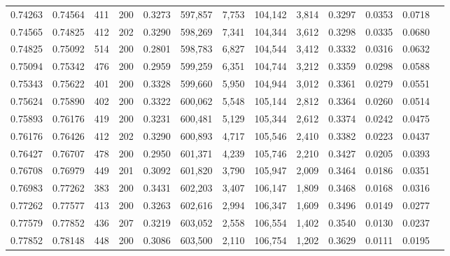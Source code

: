 \begin{tabular}{rrrrrrrrrrrrr}
0.74263 & 0.74564 &   411 & 200 &                                     0.3273 & 597,857 &   7,753 & 104,142 &   3,814 & 0.3297 & 0.0353 & 0.0718 \\
0.74565 & 0.74825 &   412 & 202 &                                     0.3290 & 598,269 &   7,341 & 104,344 &   3,612 & 0.3298 & 0.0335 & 0.0680 \\
0.74825 & 0.75092 &   514 & 200 &                                     0.2801 & 598,783 &   6,827 & 104,544 &   3,412 & 0.3332 & 0.0316 & 0.0632 \\
0.75094 & 0.75342 &   476 & 200 &                                     0.2959 & 599,259 &   6,351 & 104,744 &   3,212 & 0.3359 & 0.0298 & 0.0588 \\
0.75343 & 0.75622 &   401 & 200 &                                     0.3328 & 599,660 &   5,950 & 104,944 &   3,012 & 0.3361 & 0.0279 & 0.0551 \\
0.75624 & 0.75890 &   402 & 200 &                                     0.3322 & 600,062 &   5,548 & 105,144 &   2,812 & 0.3364 & 0.0260 & 0.0514 \\
0.75893 & 0.76176 &   419 & 200 &                                     0.3231 & 600,481 &   5,129 & 105,344 &   2,612 & 0.3374 & 0.0242 & 0.0475 \\
0.76176 & 0.76426 &   412 & 202 &                                     0.3290 & 600,893 &   4,717 & 105,546 &   2,410 & 0.3382 & 0.0223 & 0.0437 \\
0.76427 & 0.76707 &   478 & 200 &                                     0.2950 & 601,371 &   4,239 & 105,746 &   2,210 & 0.3427 & 0.0205 & 0.0393 \\
0.76708 & 0.76979 &   449 & 201 &                                     0.3092 & 601,820 &   3,790 & 105,947 &   2,009 & 0.3464 & 0.0186 & 0.0351 \\
0.76983 & 0.77262 &   383 & 200 &                                     0.3431 & 602,203 &   3,407 & 106,147 &   1,809 & 0.3468 & 0.0168 & 0.0316 \\
0.77262 & 0.77577 &   413 & 200 &                                     0.3263 & 602,616 &   2,994 & 106,347 &   1,609 & 0.3496 & 0.0149 & 0.0277 \\
0.77579 & 0.77852 &   436 & 207 &                                     0.3219 & 603,052 &   2,558 & 106,554 &   1,402 & 0.3540 & 0.0130 & 0.0237 \\
0.77852 & 0.78148 &   448 & 200 &                                     0.3086 & 603,500 &   2,110 & 106,754 &   1,202 & 0.3629 & 0.0111 & 0.0195 \\

\end{tabular}

